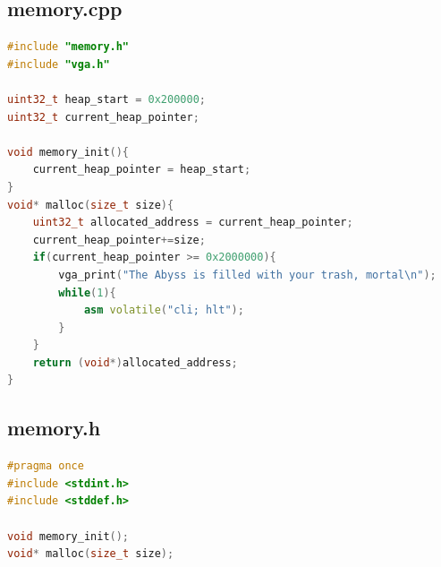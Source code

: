 \documentclass[12pt,a4paper]{report}
\begin{document}
\subsection{memory.cpp}
\begin{lstlisting}[language={C++}]
#include "memory.h"
#include "vga.h"

uint32_t heap_start = 0x200000;
uint32_t current_heap_pointer;

void memory_init(){
    current_heap_pointer = heap_start;
}
void* malloc(size_t size){
    uint32_t allocated_address = current_heap_pointer;
    current_heap_pointer+=size;
    if(current_heap_pointer >= 0x2000000){
        vga_print("The Abyss is filled with your trash, mortal\n");
        while(1){
            asm volatile("cli; hlt");
        }
    }
    return (void*)allocated_address;
}
\end{lstlisting}

\subsection{memory.h}
\begin{lstlisting}[language={C++}]
#pragma once
#include <stdint.h>
#include <stddef.h>

void memory_init();
void* malloc(size_t size);
\end{lstlisting}
\end{document}
